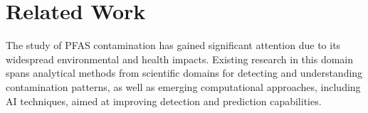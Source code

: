 \section{Related Work}
The study of PFAS contamination has gained significant attention due to its widespread environmental and health impacts. Existing research in this domain spans analytical methods from scientific domains for detecting and understanding contamination patterns, as well as emerging computational approaches, including AI techniques, aimed at improving detection and prediction capabilities. 


